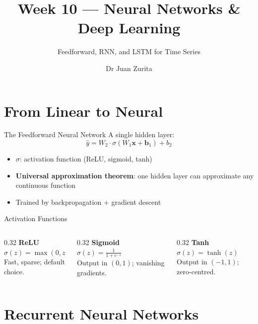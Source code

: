 \documentclass[aspectratio=169, 10pt]{beamer}
\title{Week 10 --- Neural Networks \& Deep Learning}
\subtitle{Feedforward, RNN, and LSTM for Time Series}
\author{Dr Juan Zurita}
\institute{Economic \& Business Forecasting\\
The University of Edinburgh~$\cdot$~School of Economics}
\date{}
\begin{document}
\maketitle


\section{From Linear to Neural}

\begin{frame}{The Feedforward Neural Network}
A single hidden layer:
\[
\hat{y} = W_2 \cdot \sigma(W_1 \mathbf{x} + \mathbf{b}_1) + b_2
\]

\begin{itemize}
    \item $\sigma$: activation function (ReLU, sigmoid, tanh)
    \item \textbf{Universal approximation theorem}: one hidden layer can approximate any continuous function
    \item Trained by \alert{backpropagation} + gradient descent
\end{itemize}
\end{frame}

\begin{frame}{Activation Functions}
\begin{columns}[T]
\begin{column}{0.32\textwidth}
\textbf{ReLU} \\
$\sigma(z) = \max(0, z)$ \\
Fast, sparse; default choice.
\end{column}
\begin{column}{0.32\textwidth}
\textbf{Sigmoid} \\
$\sigma(z) = \frac{1}{1+e^{-z}}$ \\
Output in $(0,1)$; vanishing gradients.
\end{column}
\begin{column}{0.32\textwidth}
\textbf{Tanh} \\
$\sigma(z) = \tanh(z)$ \\
Output in $(-1,1)$; zero-centred.
\end{column}
\end{columns}
\end{frame}

\section{Recurrent Neural Networks}
\end{document}
